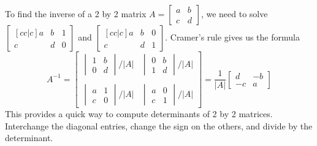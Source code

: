 \documentclass[10pt]{article}
\begin{document}
To find the inverse of a 2 by 2 matrix $A=\begin{bmatrix}a&b\\c&d\end{bmatrix}$, we need to solve $\begin{bmatrix}[cc|c]a&b&1\\c&d&0\end{bmatrix}$ and $\begin{bmatrix}[cc|c]a&b&0\\c&d&1\end{bmatrix}$.  Cramer's rule gives us the formula $$A^{-1}=
\begin{bmatrix}
\begin{vmatrix}1&b\\0&d\end{vmatrix}/|A|&\begin{vmatrix}0&b\\1&d\end{vmatrix}/|A|\\ \\
\begin{vmatrix}a&1\\c&0\end{vmatrix}/|A|&\begin{vmatrix}a&0\\c&1\end{vmatrix}/|A|\end{bmatrix} 
= \frac{1}{|A|}
\begin{bmatrix}d&-b\\-c&a\end{bmatrix}
$$
This provides a quick way to compute determinants of 2 by 2 matrices. Interchange the diagonal entries, change the sign on the others, and divide by the determinant.
\end{document}
